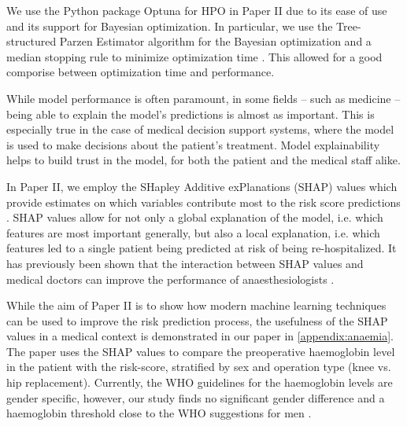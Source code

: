 We use the Python package Optuna \autocite{akibaOptunaNextgenerationHyperparameter2019} for HPO in Paper II due to its ease of use and its support for Bayesian optimization. In particular, we use the Tree-structured Parzen Estimator algorithm for the Bayesian optimization and a median stopping rule to minimize optimization time \autocite{bergstraAlgorithmsHyperParameterOptimization2011}. This allowed for a good comporise between optimization time and performance.

While model performance is often paramount, in some fields -- such as medicine -- being able to explain the model's predictions is almost as important. This is especially true in the case of medical decision support systems, where the model is used to make decisions about the patient's treatment. Model explainability helps to build trust in the model, for both the patient and the medical staff alike.

In Paper II, we employ the SHapley Additive exPlanations (SHAP) values which provide estimates on which variables contribute most to the risk score predictions \autocite{lundbergUnifiedApproachInterpreting2017,lundbergLocalExplanationsGlobal2020}. SHAP values allow for not only a global explanation of the model, i.e. which features are most important generally, but also a local explanation, i.e. which features led to a single patient being predicted at risk of being re-hospitalized. It has previously been shown that the interaction between SHAP values and medical doctors can improve the performance of anaesthesiologists \autocite{lundbergExplainableMachinelearningPredictions2018a}.

While the aim of Paper II is to show how modern machine learning techniques can be used to improve the risk prediction process, the usefulness of the SHAP values in a medical context is demonstrated in our paper in \autoref{appendix:anaemia}. The paper uses the SHAP values to compare the preoperative haemoglobin level in the patient with the risk-score, stratified by sex and operation type (knee vs. hip replacement). Currently, the WHO guidelines for the haemoglobin levels are gender specific, however, our study finds no significant gender difference and a haemoglobin threshold close to the WHO suggestions for men \autocite{anaemiasNutritionalAnaemiasReport1968}.